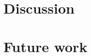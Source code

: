 \documentclass[usenatbib]{mnras}
\begin{document}


\citet{2017RSOS....470192S}
\citet{2004astro.ph..5087C}
\citet{2004ApJ...612..168P}

\section{Discussion}

\section{Future work}


\end{document}
